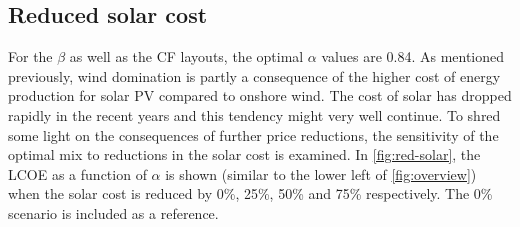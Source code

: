 \documentclass[a4paper, 5p, sort&compress]{elsarticle}%
\begin{document}
%

\subsection{Reduced solar cost}
\label{sec:reduced-solar-cost}

For the $\beta$ as well as the CF layouts, the optimal $\alpha$ values are
0.84. As mentioned previously, wind domination is partly a consequence
of the higher cost of energy production for solar PV compared to
onshore wind. The cost of solar has dropped rapidly in the recent
years and this tendency might very well continue. To shred some light
on the consequences of further price reductions, the sensitivity of
the optimal mix to reductions in the solar cost is examined. In
\cref{fig:red-solar}, the LCOE as a function of $\alpha$ is shown (similar
to the lower left of \cref{fig:overview}) when the solar cost is
reduced by 0\%, 25\%, 50\% and 75\% respectively. The 0\% scenario is
included as a reference.
\end{document}
